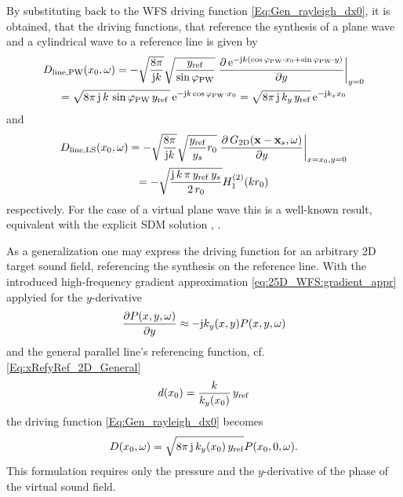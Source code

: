 By substituting back to the WFS driving function \eqref{Eq:Gen_rayleigh_dx0}, it is obtained, that the driving functions, that reference the synthesis of a plane wave and a cylindrical wave to a reference line is given by
\begin{multline}
\label{Eq:Plane_wave_ref_line}
D_\text{line,PW}(x_0,\omega)
=- \sqrt{\frac{8\pi}{\mathrm{j} k}}\sqrt{\frac{y_{\mathrm{ref}}}{\sin\varphi_\text{PW}}} \left. \frac{\partial \, \mathrm{e}^{-\mathrm{j} k (\cos\varphi_\text{PW}\cdot x_0 + \sin\varphi_\text{PW}\cdot y)}}{\partial y} \right|_{y = 0}\\
=\sqrt{8\pi\,\mathrm{j}\,k\,\sin\varphi_\text{PW}\,y_{\mathrm{ref}}\,}\,\mathrm{e}^{-\mathrm{j} k \cos\varphi_\text{PW}\cdot x_0 }
=\sqrt{8\pi\,\mathrm{j}\,k_y\,y_{\mathrm{ref}}}\,\mathrm{e}^{-\mathrm{j} k_x x_0 }
\end{multline}
and
\begin{multline}
D_\text{line,LS}(x_0,\omega) 
=- \sqrt{\frac{8\pi}{\mathrm{j} k}}\sqrt{\frac{y_{\mathrm{ref}}}{y_s} r_0} \left. \frac{\partial\,G_\text{2D}(\mathbf{x} -  \mathbf{x}_s,\omega)}{\partial y} \right|_{x=x_0, y = 0} \\
=- \sqrt{\frac{\mathrm{j}\,k\,\pi\,y_{\mathrm{ref}}\,y_s}{2\,r_0}}  H_1^{(2)}( k r_0 )
\end{multline}
respectively. For the case of a virtual plane wave this is a well-known result, equivalent with the explicit SDM solution \cite[(29)]{Ahrens2010a}, \cite{Schultz2016:DAGA, Ahrens2012}.

As a generalization one may express the driving function for an arbitrary 2D target sound field, referencing the synthesis on the reference line. 
With the introduced high-frequency gradient approximation \eqref{eq:25D_WFS:gradient_appr} applyied for the $y$-derivative
\begin{align}
\frac{\partial P(x,y,\omega)}{\partial y}  \approx  -\mathrm{j} k_y(x,y) P(x,y,\omega)
\end{align}
and the general parallel line's referencing function, cf. \eqref{Eq:xRefyRef_2D_General}
\begin{align}
d(x_0) = \frac{k}{k_y(x_0)}\,y_{\mathrm{ref}}
\end{align}
the driving function \eqref{Eq:Gen_rayleigh_dx0} becomes
\begin{equation}
D(x_0,\omega) = \sqrt{8\pi\,\mathrm{j}\,k_y(x_0)\,y_{\mathrm{ref}} } P(x_0,0,\omega).
\end{equation} 
This formulation requires only the pressure and the $y$-derivative of the phase of the virtual sound field. %

